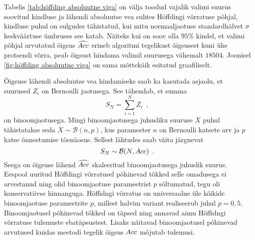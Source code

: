 Tabelis \ref{tab:höffding absoluutne viga} on välja toodud vajalik valimi suurus soovitud kindluse ja lähendi absoluutse vea suhtes Höffdingi võrratuse põhjal, kindluse puhul on sulgudes tähistatud, kui mitu normaaljaotuse standardhälvet $\sigma$ keskväärtuse ümbruses see katab. Näiteks kui on soov olla $95\%$ kindel, et valimi põhjal arvutatud õigsus $\widehat{Acc}$ erineb algoritmi tegelikust õigsusest kuni ühe protsendi võrra, peab õigsust hindama valimil suurusega vähemalt $18504$. Joonisel \ref{fig:höffding absoluutne viga} on sama mõttekäik esitatud graafiliselt.

Õigsuse lähendi absoluutse vea hindamiseks saab ka kasutada asjaolu, et suurused $Z_i$ on Bernoulli jaotusega. See tähendab, et summa
\begin{equation*}
    S_N=\sum^{N}_{i = 1}Z_i \enspace,
\end{equation*}
on binoomjaotusega. Mingi binoomjaotusega juhusliku suuruse $X$ puhul tähistatakse seda $X\sim\mathcal{B}(n, p)$, kus parameeter $n$ on Bernoulli katsete arv ja $p$ katse õnnestumise tõenäosus. Sellest lähtudes saab väita järgnevat
\begin{equation*}
    S_N\sim\mathcal{B}(N, Acc) \enspace.
\end{equation*}
Seega on õigsuse lähend $\widehat{Acc}$ skaleeritud binoomjaotusega juhuslik suurus. Eespool uuritud Höffdingi võrratusel põhinevad tõkked selle omadusega ei arvestanud ning olid binoomjaotuse parameetrist $p$ sõltumatud, tegu oli konservatiivse hinnanguga. Höffidngi võrratus on universaalne üle kõikide binoomjaotuse parameetrite $p$, millest halvim variant realiseerub juhul $p=0{,}5$. Binoomjaotusel põhinevad tõkked on täpsed ning annavad aimu Höffidngi võrratuse tulemuste ebatäpsustest. Lisaks näitavad binoomjaotusel põhinevad arvutused kuidas meetodi tegelik õigsus $Acc$ mõjutab tulemusi.

